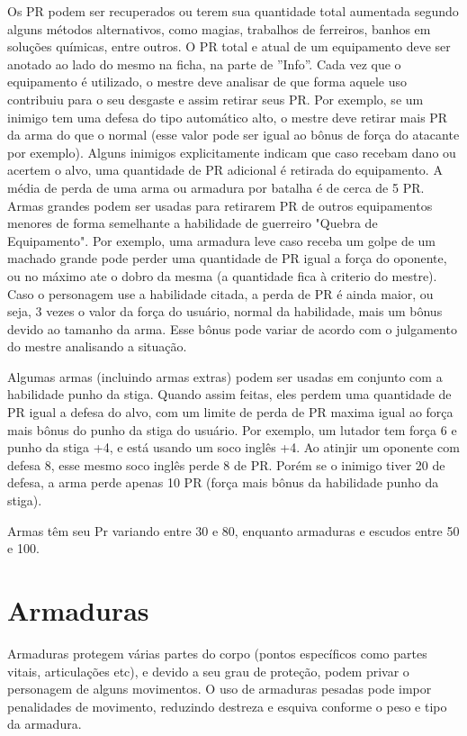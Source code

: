 Os PR podem ser recuperados ou terem sua quantidade total aumentada segundo alguns métodos alternativos, como magias, trabalhos de ferreiros, banhos em soluções químicas, entre outros. O PR total e atual de um equipamento deve ser anotado ao lado do mesmo na ficha, na parte de ''Info''. Cada vez que o equipamento é utilizado, o mestre deve analisar de que forma aquele uso contribuiu para o seu desgaste e assim retirar seus PR. Por exemplo, se um inimigo tem uma defesa do tipo automático alto, o mestre deve retirar mais PR da arma do que o normal (esse valor pode ser igual ao bônus de força do atacante por exemplo). Alguns inimigos explicitamente indicam que caso recebam dano ou acertem o alvo, uma quantidade de PR adicional é retirada do equipamento. A média de perda de uma arma ou armadura por batalha é de cerca de 5 PR. Armas grandes podem ser usadas para retirarem PR de outros equipamentos menores de forma semelhante a habilidade de guerreiro "Quebra de Equipamento". Por exemplo, uma armadura leve caso receba um golpe de um machado grande pode perder uma quantidade de PR igual a força do oponente, ou no máximo ate o dobro da mesma (a quantidade fica à criterio do mestre). Caso o personagem use a habilidade citada, a perda de PR é ainda maior, ou seja, 3 vezes o valor da força do usuário, normal da habilidade,  mais um bônus devido ao tamanho da arma. Esse bônus pode variar de acordo com o julgamento do mestre analisando a situação.


Algumas armas (incluindo armas extras) podem ser usadas em conjunto com a habilidade punho da stiga. Quando assim feitas, eles perdem uma quantidade de PR igual a defesa do alvo, com um limite de perda de PR maxima igual ao força mais bônus do punho da stiga do usuário. Por exemplo, um lutador tem força 6 e punho da stiga +4, e está usando um soco inglês +4. Ao atinjir um oponente com defesa 8, esse mesmo soco inglês perde 8 de PR. Porém se o inimigo tiver 20 de defesa, a arma perde apenas 10 PR (força mais bônus da habilidade punho da stiga).

Armas têm seu Pr variando entre 30 e 80, enquanto armaduras e escudos entre 50 e 100.


\section{Armaduras}

Armaduras protegem várias partes do corpo (pontos específicos como partes vitais, articulações etc), e devido a seu grau de proteção, podem privar o personagem de alguns movimentos. O uso de armaduras pesadas pode impor penalidades de movimento, reduzindo destreza e esquiva conforme o peso e tipo da armadura.

